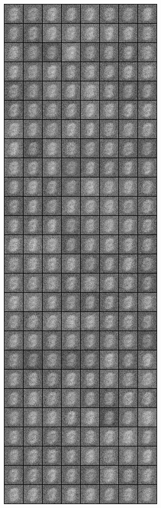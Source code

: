 \begin{figure}
\includegraphics[width=\picwidth\columnwidth]{figures/supplementary/mnist/image_50.png}

\end{figure}
